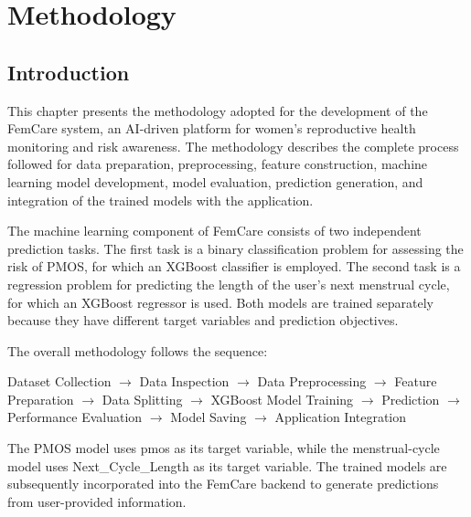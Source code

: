
\chapter{Methodology}\doublespacing
\label{chap:implementation}

\section{Introduction}
\label{sec:impl-intro}

This chapter presents the methodology adopted for the development of the FemCare system, an AI-driven platform for women’s reproductive health monitoring and risk awareness. The methodology describes the complete process followed for data preparation, preprocessing, feature construction, machine learning model development, model evaluation, prediction generation, and integration of the trained models with the application.

The machine learning component of FemCare consists of two independent prediction tasks. The first task is a binary classification problem for assessing the risk of PMOS, for which an XGBoost classifier is employed. The second task is a regression problem for predicting the length of the user's next menstrual cycle, for which an XGBoost regressor is used. Both models are trained separately because they have different target variables and prediction objectives.

The overall methodology follows the sequence:

Dataset Collection $\rightarrow$ Data Inspection $\rightarrow$ Data Preprocessing $\rightarrow$ Feature Preparation $\rightarrow$ Data Splitting $\rightarrow$ XGBoost Model Training $\rightarrow$ Prediction $\rightarrow$ Performance Evaluation $\rightarrow$ Model Saving $\rightarrow$ Application Integration

The PMOS model uses pmos as its target variable, while the menstrual-cycle model uses Next\_Cycle\_Length as its target variable. The trained models are subsequently incorporated into the FemCare backend to generate predictions from user-provided information.

